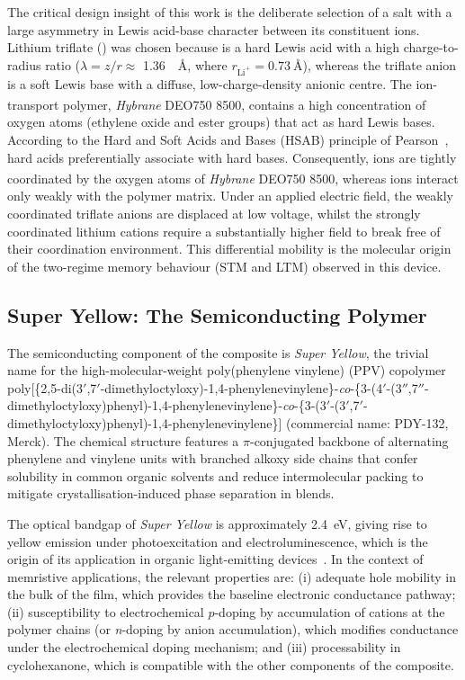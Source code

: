 \documentclass[12pt, a4paper, twoside]{report}
\newcommand{\SY}{\textit{Super Yellow}}
\newcommand{\Hybrane}{\textit{Hybrane}\textsuperscript{\textregistered} DEO750 8500}
\newcommand{\LiTf}{\ce{LiCF3SO3}}
\begin{document}
The critical design insight of this work is the deliberate selection of a salt with a large asymmetry in Lewis acid-base character between its constituent ions. Lithium triflate (\LiTf{}) was chosen because  is a hard Lewis acid with a high charge-to-radius ratio (\(\lambda = z/r \approx\) \SI{1.36}{\per\angstrom}, where $r_{\mathrm{Li^+}} = \SI{0.73}{\angstrom}$), whereas the triflate anion  is a soft Lewis base with a diffuse, low-charge-density anionic centre. The ion-transport polymer, \Hybrane{}, contains a high concentration of oxygen atoms (ethylene oxide and ester groups) that act as hard Lewis bases. According to the Hard and Soft Acids and Bases (HSAB) principle of Pearson~\cite{Pearson1963}, hard acids preferentially associate with hard bases. Consequently,  ions are tightly coordinated by the oxygen atoms of \Hybrane{}, whereas  ions interact only weakly with the polymer matrix. Under an applied electric field, the weakly coordinated triflate anions are displaced at low voltage, whilst the strongly coordinated lithium cations require a substantially higher field to break free of their coordination environment. This differential mobility is the molecular origin of the two-regime memory behaviour (STM and LTM) observed in this device.

\subsection{Super Yellow: The Semiconducting Polymer}\label{subsec:sy}

The semiconducting component of the composite is \SY{}, the trivial name for the high-molecular-weight poly(phenylene vinylene) (PPV) copolymer poly[\{2,5-di(3$'$,7$'$-dimethyloctyloxy)-1,4-phenylenevinylene\}-\textit{co}-\{3-(4$'$-(3$''$,7$''$-dimethyloctyloxy)phenyl)-1,4-phenylenevinylene\}-\textit{co}-\{3-(3$'$-(3$'$,7$'$-dimethyloctyloxy)phenyl)-1,4-phenylenevinylene\}] (commercial name: PDY-132, Merck). The chemical structure features a $\pi$-conjugated backbone of alternating phenylene and vinylene units with branched alkoxy side chains that confer solubility in common organic solvents and reduce intermolecular packing to mitigate crystallisation-induced phase separation in blends.

The optical bandgap of \SY{} is approximately \SI{2.4}{\electronvolt}, giving rise to yellow emission under photoexcitation and electroluminescence, which is the origin of its application in organic light-emitting devices~\cite{Friend1999}. In the context of memristive applications, the relevant properties are: (i) adequate hole mobility in the bulk of the film, which provides the baseline electronic conductance pathway; (ii) susceptibility to electrochemical $p$-doping by accumulation of cations at the polymer chains (or \textit{n}-doping by anion accumulation), which modifies conductance under the electrochemical doping mechanism; and (iii) processability in cyclohexanone, which is compatible with the other components of the composite.
\end{document}
